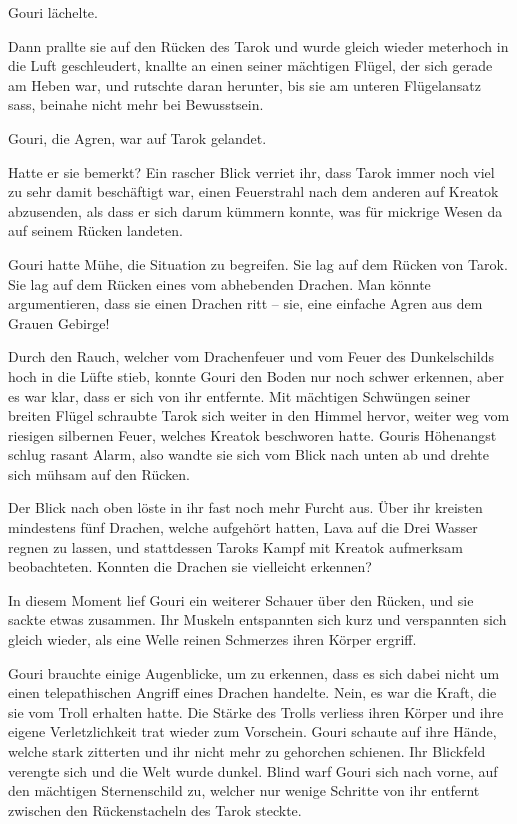 Gouri lächelte.

Dann prallte sie auf den Rücken des Tarok und wurde gleich wieder meterhoch in die Luft geschleudert, knallte an einen seiner mächtigen Flügel, der sich gerade am Heben war, und rutschte daran herunter, bis sie am unteren Flügelansatz sass, beinahe nicht mehr bei Bewusstsein.

Gouri, die Agren, war auf Tarok gelandet.

Hatte er sie bemerkt? Ein rascher Blick verriet ihr, dass Tarok immer noch viel zu sehr damit beschäftigt war, einen Feuerstrahl nach dem anderen auf Kreatok abzusenden, als dass er sich darum kümmern konnte, was für mickrige Wesen da auf seinem Rücken landeten.

Gouri hatte Mühe, die Situation zu begreifen. Sie lag auf dem Rücken von Tarok. Sie lag auf dem Rücken eines vom abhebenden Drachen. Man könnte argumentieren, dass sie einen Drachen ritt – sie, eine einfache Agren aus dem Grauen Gebirge!

Durch den Rauch, welcher vom Drachenfeuer und vom Feuer des Dunkelschilds hoch in die Lüfte stieb, konnte Gouri den Boden nur noch schwer erkennen, aber es war klar, dass er sich von ihr entfernte. Mit mächtigen Schwüngen seiner breiten Flügel schraubte Tarok sich weiter in den Himmel hervor, weiter weg vom riesigen silbernen Feuer, welches Kreatok beschworen hatte. Gouris Höhenangst schlug rasant Alarm, also wandte sie sich vom Blick nach unten ab und drehte sich mühsam auf den Rücken.

Der Blick nach oben löste in ihr fast noch mehr Furcht aus. Über ihr kreisten mindestens fünf Drachen, welche aufgehört hatten, Lava auf die Drei Wasser regnen zu lassen, und stattdessen Taroks Kampf mit Kreatok aufmerksam beobachteten. Konnten die Drachen sie vielleicht erkennen?

In diesem Moment lief Gouri ein weiterer Schauer über den Rücken, und sie sackte etwas zusammen. Ihr Muskeln entspannten sich kurz und verspannten sich gleich wieder, als eine Welle reinen Schmerzes ihren Körper ergriff.

Gouri brauchte einige Augenblicke, um zu erkennen, dass es sich dabei nicht um einen telepathischen Angriff eines Drachen handelte. Nein, es war die Kraft, die sie vom Troll erhalten hatte. Die Stärke des Trolls verliess ihren Körper und ihre eigene Verletzlichkeit trat wieder zum Vorschein. Gouri schaute auf ihre Hände, welche stark zitterten und ihr nicht mehr zu gehorchen schienen. Ihr Blickfeld verengte sich und die Welt wurde dunkel. Blind warf Gouri sich nach vorne, auf den mächtigen Sternenschild zu, welcher nur wenige Schritte von ihr entfernt zwischen den Rückenstacheln des Tarok steckte.

